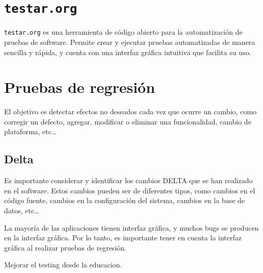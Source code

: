 \section{\texttt{testar.org}}

\texttt{testar.org} es una herramienta de código abierto para la automatización de pruebas de software. Permite crear y ejecutar pruebas automatizadas de manera sencilla y rápida, y cuenta con una interfaz gráfica intuitiva que facilita su uso.


\section{Pruebas de regresión}

El objetivo es detectar efectos no deseados cada vez que ocurre un cambio, como corregir un defecto, agregar, modificar o eliminar una funcionalidad, cambio de plataforma, etc\dots

\subsection{Delta}

Es importante considerar y identificar los cambios DELTA que se han realizado en el software. Estos cambios pueden ser de diferentes tipos, como cambios en el código fuente, cambios en la configuración del sistema, cambios en la base de datos, etc\dots 

La mayoría de las aplicaciones tienen interfaz gráfica, y muchos bugs se producen en la interfaz gráfica. Por lo tanto, es importante tener en cuenta la interfaz gráfica al realizar pruebas de regresión.

Mejorar el testing desde la educacion.

